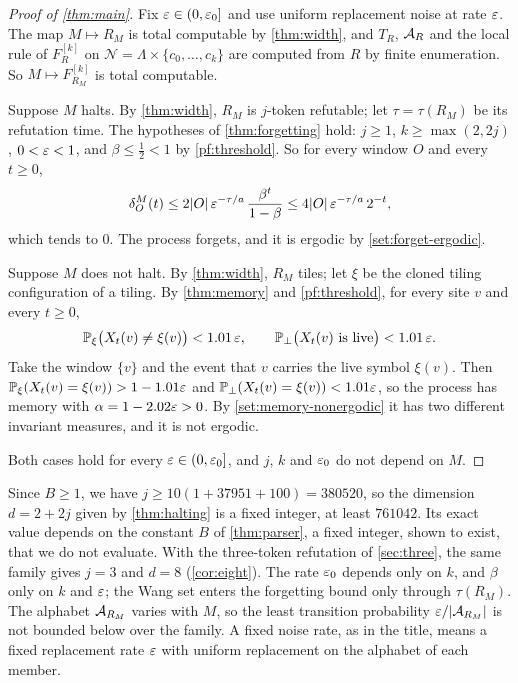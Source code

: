\begin{proof}[Proof of \cref{thm:main}]
Fix $\varepsilon\in(0,\varepsilon_0]$ and use uniform replacement noise at rate $\varepsilon$. The map $M\mapsto R_M$ is total computable by \cref{thm:width}, and $T_R$, $\mathcal{A}_R$ and the local rule of $F^{[k]}_R$ on $\mathcal N=\Lambda\times\{c_0,\dots,c_k\}$ are computed from $R$ by finite enumeration. So $M\mapsto F^{[k]}_{R_M}$ is total computable.

Suppose $M$ halts. By \cref{thm:width}, $R_M$ is $j$-token refutable; let $\tau=\tau(R_M)$ be its refutation time. The hypotheses of \cref{thm:forgetting} hold: $j\ge1$, $k\ge\max(2,2j)$, $0<\varepsilon<1$, and $\beta\le\frac12<1$ by \cref{pf:threshold}. So for every window $O$ and every $t\ge0$,
\begin{equation}\label{pf:eq-forget}
\delta^M_O(t)\le2|O|\,\varepsilon^{-\tau/a}\,\frac{\beta^t}{1-\beta}\le4|O|\,\varepsilon^{-\tau/a}\,2^{-t},
\end{equation}
which tends to $0$. The process forgets, and it is ergodic by \cref{set:forget-ergodic}.

Suppose $M$ does not halt. By \cref{thm:width}, $R_M$ tiles; let $\xi$ be the cloned tiling configuration of a tiling. By \cref{thm:memory} and \cref{pf:threshold}, for every site $v$ and every $t\ge0$,
\begin{equation}\label{pf:eq-memory}
\mathbb{P}_\xi\bigl(X_t(v)\ne\xi(v)\bigr)<1.01\,\varepsilon,\qquad \mathbb{P}_\bot\bigl(X_t(v)\text{ is live}\bigr)<1.01\,\varepsilon .
\end{equation}
Take the window $\{v\}$ and the event that $v$ carries the live symbol $\xi(v)$. Then $\mathbb{P}_\xi(X_t(v)=\xi(v))>1-1.01\varepsilon$ and $\mathbb{P}_\bot(X_t(v)=\xi(v))<1.01\varepsilon$, so the process has memory with $\alpha=1-2.02\varepsilon>0$. By \cref{set:memory-nonergodic} it has two different invariant measures, and it is not ergodic.

Both cases hold for every $\varepsilon\in(0,\varepsilon_0]$, and $j$, $k$ and $\varepsilon_0$ do not depend on $M$.
\end{proof}

\begin{remark}\label{pf:scope}
Since $B\ge1$, we have $j\ge10(1+37951+100)=380520$, so the dimension $d=2+2j$ given by \cref{thm:halting} is a fixed integer, at least $761042$. Its exact value depends on the constant $B$ of \cref{thm:parser}, a fixed integer, shown to exist, that we do not evaluate. With the three-token refutation of \cref{sec:three}, the same family gives $j=3$ and $d=8$ (\cref{cor:eight}). The rate $\varepsilon_0$ depends only on $k$, and $\beta$ only on $k$ and $\varepsilon$; the Wang set enters the forgetting bound only through $\tau(R_M)$. The alphabet $\mathcal{A}_{R_M}$ varies with $M$, so the least transition probability $\varepsilon/|\mathcal{A}_{R_M}|$ is not bounded below over the family. A fixed noise rate, as in the title, means a fixed replacement rate $\varepsilon$ with uniform replacement on the alphabet of each member.
\end{remark}

